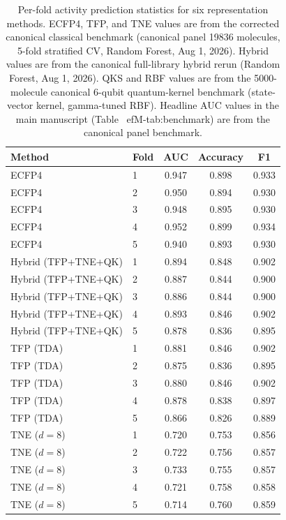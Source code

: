 \documentclass[11pt,a4paper]{article}
\begin{document}
\begin{table}[htbp]
\centering
\caption{Per-fold activity prediction statistics for six representation methods. ECFP4, TFP, and TNE values are from the corrected canonical classical benchmark (canonical panel \num{19836} molecules, 5-fold stratified CV, Random Forest, Aug 1, 2026). Hybrid values are from the canonical full-library hybrid rerun (Random Forest, Aug 1, 2026). QKS and RBF values are from the \num{5000}-molecule canonical 6-qubit quantum-kernel benchmark (state-vector kernel, gamma-tuned RBF). Headline AUC values in the main manuscript (Table~
ef{M-tab:benchmark}) are from the canonical panel benchmark.}
\label{tab:sm_s4_perfold}
\small
\begin{tabularx}{\textwidth}{l l S[table-format=1.3] S[table-format=1.3] S[table-format=1.3]}
\toprule
Method & Fold & {AUC} & {Accuracy} & {F1} \\
\midrule
ECFP4 & 1 & 0.947 & 0.898 & 0.933 \\
ECFP4 & 2 & 0.950 & 0.894 & 0.930 \\
ECFP4 & 3 & 0.948 & 0.895 & 0.930 \\
ECFP4 & 4 & 0.952 & 0.899 & 0.934 \\
ECFP4 & 5 & 0.940 & 0.893 & 0.930 \\
\midrule
Hybrid (TFP+TNE+QK) & 1 & 0.894 & 0.848 & 0.902 \\
Hybrid (TFP+TNE+QK) & 2 & 0.887 & 0.844 & 0.900 \\
Hybrid (TFP+TNE+QK) & 3 & 0.886 & 0.844 & 0.900 \\
Hybrid (TFP+TNE+QK) & 4 & 0.893 & 0.846 & 0.902 \\
Hybrid (TFP+TNE+QK) & 5 & 0.878 & 0.836 & 0.895 \\
\midrule
TFP (TDA) & 1 & 0.881 & 0.846 & 0.902 \\
TFP (TDA) & 2 & 0.875 & 0.836 & 0.895 \\
TFP (TDA) & 3 & 0.880 & 0.846 & 0.902 \\
TFP (TDA) & 4 & 0.878 & 0.838 & 0.897 \\
TFP (TDA) & 5 & 0.866 & 0.826 & 0.889 \\
\midrule
TNE ($d=8$) & 1 & 0.720 & 0.753 & 0.856 \\
TNE ($d=8$) & 2 & 0.722 & 0.756 & 0.857 \\
TNE ($d=8$) & 3 & 0.733 & 0.755 & 0.857 \\
TNE ($d=8$) & 4 & 0.721 & 0.758 & 0.858 \\
TNE ($d=8$) & 5 & 0.714 & 0.760 & 0.859 \\

\end{tabularx}
\end{table}
\end{document}
